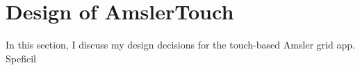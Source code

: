 
\section{Design of AmslerTouch}
In this section, I discuss my design decisions for the touch-based Amsler grid app. Speficil